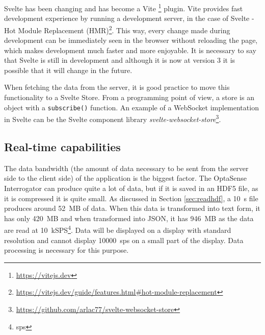 Svelte has been changing and has become a Vite \footnote{\url{https://vitejs.dev}} plugin. Vite provides fast development experience by running a development server, in the case of Svelte - Hot Module Replacement (HMR)\footnote{\url{https://vitejs.dev/guide/features.html\#hot-module-replacement}}. This way, every change made during development can be immediately seen in the browser without reloading the page, which makes development much faster and more enjoyable. It is necessary to say that Svelte is still in development and although it is now at version 3 it is possible that it will change in the future. 

When fetching the data from the server, it is good practice to move this functionality to a Svelte Store. From a programming point of view, a store is an object with a \verb|subscribe()| function. An example of a WebSocket implementation in Svelte can be the Svelte component library \textit{svelte-websocket-store}\footnote{\url{https://github.com/arlac77/svelte-websocket-store}}.

\subsection{Real-time capabilities}

The data bandwidth (the amount of data necessary to be sent from the server side to the client side) of the application is the biggest factor. The OptaSense Interrogator can produce quite a lot of data, but if it is saved in an HDF5 file, as it is compressed it is quite small. As discussed in Section \ref{sec:readhdf}, a \qty{10}{\second} file produces around \qty{52}{MB} of data. When this data is transformed into text form, it has only \qty{420}{MB} and when transformed into JSON, it has \qty{946}{MB} as the data are read at  \qty{10}{kSPS}\footnote{\ac{sps}}. Data will be displayed on a display with standard resolution and cannot display \qty{10000}{\ac{sps}} on a small part of the display. Data processing is necessary for this purpose. 



